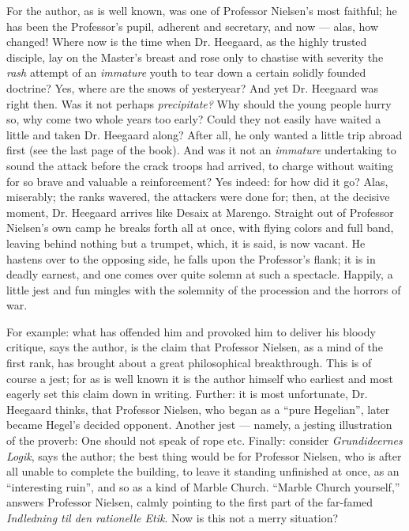 \documentclass[12pt,a4paper,openany]{book}
\newcommand{\opage}[1]{\marginnote{\footnotesize\textit{[#1]}}}
\begin{document}
For the author, as is well known, was one of Professor
Nielsen's most faithful; he has been the Professor's pupil,
adherent and secretary, and now --- alas, how changed! Where now
is the time when Dr. Heegaard, as the highly trusted disciple,
lay on the Master's breast and rose only to chastise with severity
the \emph{rash} attempt of an \emph{immature} youth to tear down a
certain solidly founded doctrine? Yes, where are the snows of
yesteryear? And yet Dr. Heegaard was right then. Was it not
perhaps \emph{precipitate?} Why should the young people hurry so,
why come two whole years too early? Could they not easily have
waited a little and taken Dr. Heegaard along? After all, he only
wanted a little trip abroad first (see the last page of the
book). And was it not
\opage{107}an \emph{immature} undertaking to sound the attack before the
crack troops had arrived, to charge without waiting for so brave
and valuable a reinforcement? Yes indeed: for how did it go?
Alas, miserably; the ranks wavered, the attackers were done for;
then, at the decisive moment, Dr. Heegaard arrives like Desaix at
Marengo. Straight out of Professor Nielsen's own camp he breaks
forth all at once, with flying colors and full band, leaving
behind nothing but a trumpet, which, it is said, is now vacant.
He hastens over to the opposing side, he falls upon the
Professor's flank; it is in deadly earnest, and one comes over
quite solemn at such a spectacle. Happily, a little jest and fun
mingles with the solemnity of the procession and the horrors of
war.

For example: what has offended him and provoked him to deliver
his bloody critique, says the author, is the claim that Professor
Nielsen, as a mind of the first rank, has brought about a great
philosophical breakthrough. This is of course a jest; for
as is well known it is the author himself who earliest and most
eagerly set this claim down in writing. Further: it is most
unfortunate, Dr. Heegaard thinks, that Professor Nielsen, who
began as a ``pure Hegelian'', later became Hegel's decided
opponent. Another jest --- namely, a jesting illustration of the
proverb: One should not speak of rope etc. Finally: consider
\emph{Grundideernes Logik}, says the author; the best thing would
be for Professor Nielsen, who is after all unable to complete the
building, to leave it standing unfinished at once, as an
``interesting ruin'', and so as a kind of Marble Church. ``Marble
Church yourself,'' answers Professor Nielsen, calmly pointing to
the first part of the far-famed \emph{Indledning til den
rationelle Etik}. Now is this not a merry situation?
\end{document}
